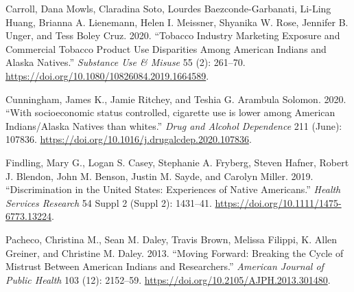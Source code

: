 \documentclass[
  letterpaper,
  DIV=11,
  numbers=noendperiod]{scrartcl}
\newlength{\cslhangindent}
\newlength{\cslentryspacingunit} %
\newenvironment{CSLReferences}[2] %
 {%
  \setlength{\parindent}{0pt}
  \ifodd #1
  \let\oldpar\par
  \def\par{\hangindent=\cslhangindent\oldpar}
  \fi
  \setlength{\parskip}{#2\cslentryspacingunit}
 }%
 {}
\begin{document}
\hypertarget{refs}{}
\begin{CSLReferences}{1}{0}
\leavevmode{}%
Carroll, Dana Mowls, Claradina Soto, Lourdes Baezconde-Garbanati,
Li-Ling Huang, Brianna A. Lienemann, Helen I. Meissner, Shyanika W.
Rose, Jennifer B. Unger, and Tess Boley Cruz. 2020. {``Tobacco Industry
Marketing Exposure and Commercial Tobacco Product Use Disparities Among
American Indians and Alaska Natives.''} \emph{Substance Use \& Misuse}
55 (2): 261--70. \url{https://doi.org/10.1080/10826084.2019.1664589}.

\leavevmode{}%
Cunningham, James K., Jamie Ritchey, and Teshia G. Arambula Solomon.
2020. {``With socioeconomic status controlled, cigarette use is lower
among American Indians/Alaska Natives than whites.''} \emph{Drug and
Alcohol Dependence} 211 (June): 107836.
\url{https://doi.org/10.1016/j.drugalcdep.2020.107836}.

\leavevmode{}%
Findling, Mary G., Logan S. Casey, Stephanie A. Fryberg, Steven Hafner,
Robert J. Blendon, John M. Benson, Justin M. Sayde, and Carolyn Miller.
2019. {``Discrimination in the United States: Experiences of Native
Americans.''} \emph{Health Services Research} 54 Suppl 2 (Suppl 2):
1431--41. \url{https://doi.org/10.1111/1475-6773.13224}.

\leavevmode{}%
Pacheco, Christina M., Sean M. Daley, Travis Brown, Melissa Filippi, K.
Allen Greiner, and Christine M. Daley. 2013. {``Moving Forward: Breaking
the Cycle of Mistrust Between American Indians and Researchers.''}
\emph{American Journal of Public Health} 103 (12): 2152--59.
\url{https://doi.org/10.2105/AJPH.2013.301480}.

\end{CSLReferences}
\end{document}
